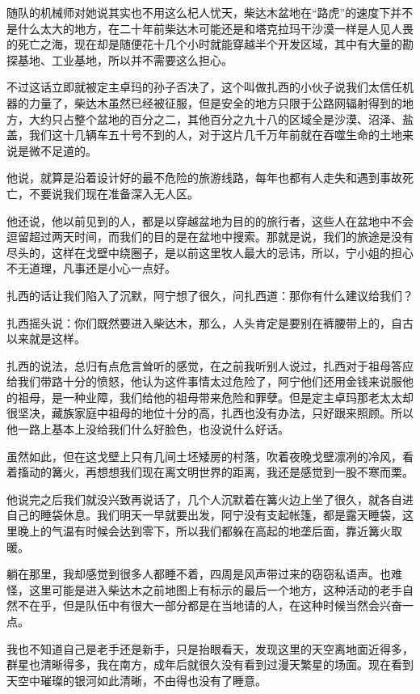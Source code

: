 随队的机械师对她说其实也不用这么杞人忧天，柴达木盆地在“路虎”的速度下并不是什么太大的地方，在二十年前柴达木可能还是和塔克拉玛干沙漠一样是人见人畏的死亡之海，现在却是随便花十几个小时就能穿越半个开发区域，其中有大量的勘探基地、工业基地，所以并不需要这么担心。

不过这话立即就被定主卓玛的孙子否决了，这个叫做扎西的小伙子说我们太信任机器的力量了，柴达木虽然已经被征服，但是安全的地方只限于公路网辐射得到的地方，大约只占整个盆地的百分之二，其他百分之九十八的区域全是沙漠、沼泽、盐盖，我们这十几辆车五十号不到的人，对于这片几千万年前就在吞噬生命的土地来说是微不足道的。

他说，就算是沿着设计好的最不危险的旅游线路，每年也都有人走失和遇到事故死亡，不要说我们现在准备深入无人区。

他还说，他以前见到的人，都是以穿越盆地为目的的旅行者，这些人在盆地中不会逗留超过两天时间，而我们的目的是在盆地中搜索。那就是说，我们的旅途是没有尽头的，这样在戈壁中绕圈子，是以前这里牧人最大的忌讳，所以，宁小姐的担心不无道理，凡事还是小心一点好。

扎西的话让我们陷入了沉默，阿宁想了很久，问扎西道：那你有什么建议给我们？

扎西摇头说：你们既然要进入柴达木，那么，人头肯定是要别在裤腰带上的，自古以来就是这样。

扎西的说法，总归有点危言耸听的感觉，在之前我听别人说过，扎西对于祖母答应给我们带路十分的愤怒，他认为这件事情太过危险了，阿宁他们还用金钱来说服他的祖母，是一种业障，我们给他的祖母带来危险和罪孽。但是定主卓玛那老太太却很坚决，藏族家庭中祖母的地位十分的高，扎西也没有办法，只好跟来照顾。所以他一路上基本上没给我们什么好脸色，也没说什么好话。

虽然如此，但在这戈壁上只有几间土坯矮房的村落，吹着夜晚戈壁凛冽的冷风，看着搐动的篝火，再想想我们现在离文明世界的距离，我还是感觉到一股不寒而栗。

他说完之后我们就没兴致再说话了，几个人沉默着在篝火边上坐了很久，就各自进自己的睡袋休息。我们明天一早就要出发，阿宁没有支起帐篷，都是露天睡袋，这里晚上的气温有时候会达到零下，所以我们都躲在高起的地垄后面，靠近篝火取暖。

躺在那里，我却感觉到很多人都睡不着，四周是风声带过来的窃窃私语声。也难怪，这里可能是进入柴达木之前地图上有标示的最后一个地方，这种活动的老手自然不在乎，但是队伍中有很大一部分都是在当地请的人，在这种时候当然会兴奋一点。

我也不知道自己是老手还是新手，只是抬眼看天，发现这里的天空离地面近得多，群星也清晰得多，我在南方，成年后就很久没有看到过漫天繁星的场面。现在看到天空中璀璨的银河如此清晰，不由得也没有了睡意。

